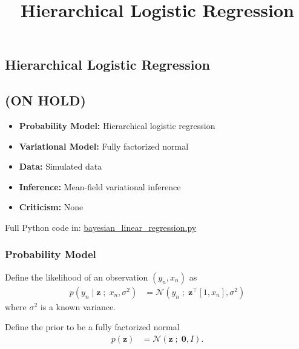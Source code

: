 \title{Hierarchical Logistic Regression}

\subsection{Hierarchical Logistic Regression}

\subsection{(ON HOLD)}

\begin{itemize}
  \item \textbf{Probability Model:} Hierarchical logistic regression
  \item \textbf{Variational Model:} Fully factorized normal
  \item \textbf{Data:} Simulated data
  \item \textbf{Inference:} Mean-field variational inference
  \item \textbf{Criticism:} None
\end{itemize}

Full Python code in:
\href{https://github.com/blei-lab/edward/blob/master/examples/tf_hierarchical_logistic_regression.py}
{bayesian_linear_regression.py}


\subsubsection{Probability Model}
Define the likelihood of an observation $(y_n, x_n)$ as
\begin{align*}
  p(y_n \mid \mathbf{z} \;;\; x_n, \sigma^2)
  &=
  \mathcal{N}(y_n \;;\; \mathbf{z}^\top [1, x_n], \sigma^2)
\end{align*}
where $\sigma^2$ is a known variance.

Define the prior to be a fully factorized normal
\begin{align*}
  p(\mathbf{z})
  &=
  \mathcal{N}(\mathbf{z} \;;\; \mathbf{0}, I).
\end{align*}

